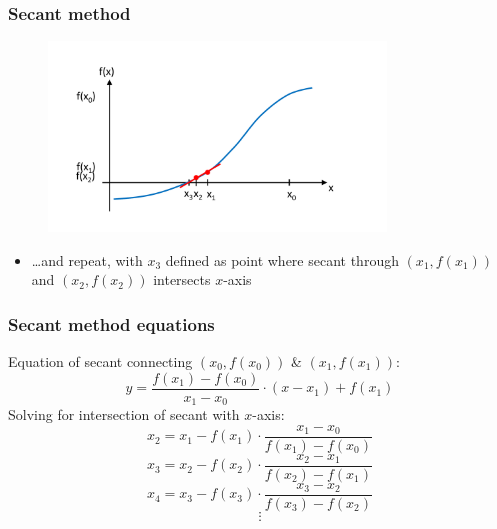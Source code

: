 \documentclass[english,14pt]{beamer}
\begin{document}

\begin{frame}[fragile]

\frametitle{Secant method}

\vspace*{-15mm}
\begin{figure}[ht]
	\centering
	\includegraphics[width=0.8\textwidth]{figures/secant3}
\end{figure}
\vspace*{-10mm}
\begin{itemize}
	\item[] \ldots and repeat, with $x_3$ defined as point where secant through $(x_1,f(x_1))$ and $(x_2,f(x_2))$ intersects $x$-axis
\end{itemize}

\end{frame}


\begin{frame}[fragile]

\frametitle{Secant method equations}
\vspace*{-2mm}
Equation of secant connecting $(x_0,f(x_0))$ \& $(x_1,f(x_1))$:
\[
	y = \frac{f(x_1)-f(x_0)}{x_1 - x_0}\cdot\left( x - x_1 \right) + f(x_1)
\]
Solving for intersection of secant with $x$-axis:
\[
	x_2 = x_1 - f(x_1)\cdot\frac{x_1 - x_0}{f(x_1) - f(x_0)}
\]
\pause
\[
	x_3 = x_2 - f(x_2)\cdot\frac{x_2 - x_1}{f(x_2) - f(x_1)}
\]
\[
	x_4 = x_3 - f(x_3)\cdot\frac{x_3 - x_2}{f(x_3) - f(x_2)}
\]
\[
	\vdots
\]

\end{frame}

%
%
%
%
\end{document}
